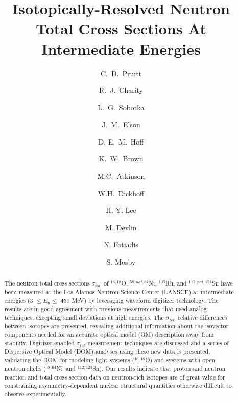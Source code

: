 \documentclass[twocolumn,secnumarabic,amssymb, nobibnotes, aps, prl,
superscriptaddress, nobalancelastpage, draft]{revtex4}
\newcommand{\tot}{\ensuremath{\sigma_{tot}}}
\newcommand{\oSixEight}{\ensuremath{^{16,18}}O}
\newcommand{\niEightFour}{\ensuremath{^{58,64}}N\lowercase{i}}
\newcommand{\snTwelveFour}{\ensuremath{^{112,124}}S\lowercase{n}}
\begin{document}
\begin{abstract}
    The neutron total cross sections \tot\ of $^{16,18}$O,
    $^{58,nat,64}$Ni, $^{103}$Rh, and $^{112,nat,124}$Sn have been measured at the Los Alamos
    Neutron Science Center (LANSCE) at intermediate energies (3 $\leq E_{n}
    \leq$ 450 MeV) by
    leveraging waveform digitizer technology. The results are in good agreement
    with previous measurements that used analog techniques,
    excepting small deviations at high energies.
    The \tot\ relative differences between isotopes are presented,
    revealing additional information about
    the isovector components needed for an accurate optical model (OM)
    description away from stability. Digitizer-enabled \tot-measurement
    techniques are discussed and a series of Dispersive Optical Model (DOM)
    analyses using these new data is presented, validating the DOM for modeling light
    systems (\oSixEight) and systems with open neutron shells (\niEightFour\ and \snTwelveFour).
    Our results indicate that proton and neutron reaction and total cross
    section data on neutron-rich isotopes are of great value for constraining
    asymmetry-dependent nuclear structural quantities otherwise difficult
    to observe experimentally.
\end{abstract}

\title{Isotopically-Resolved Neutron Total Cross Sections At
Intermediate Energies}

\author{C.~D.~Pruitt}  
\author{R.~J.~Charity}
\author{L.~G.~Sobotka}
\author{J.~M.~Elson}
\author{D. E.~M.~Hoff}  
\author{K.~W.~Brown} 

\author{M.C.~Atkinson}
\author{W.H.~Dickhoff}

\author{H. Y. Lee}
\author{M. Devlin}
\author{N. Fotiadis}
\author{S. Mosby}
\maketitle
\end{document}
